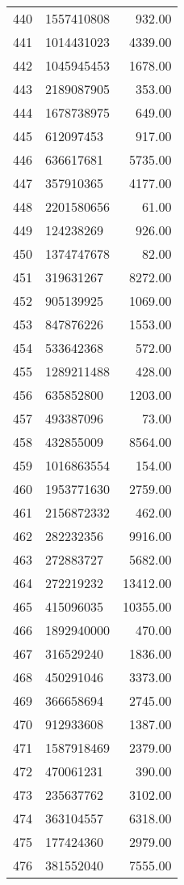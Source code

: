 \begin{table}[ht]
\begin{tabular}{rlr}
  440 & 1557410808 & 932.00 \\ 
  441 & 1014431023 & 4339.00 \\ 
  442 & 1045945453 & 1678.00 \\ 
  443 & 2189087905 & 353.00 \\ 
  444 & 1678738975 & 649.00 \\ 
  445 & 612097453 & 917.00 \\ 
  446 & 636617681 & 5735.00 \\ 
  447 & 357910365 & 4177.00 \\ 
  448 & 2201580656 & 61.00 \\ 
  449 & 124238269 & 926.00 \\ 
  450 & 1374747678 & 82.00 \\ 
  451 & 319631267 & 8272.00 \\ 
  452 & 905139925 & 1069.00 \\ 
  453 & 847876226 & 1553.00 \\ 
  454 & 533642368 & 572.00 \\ 
  455 & 1289211488 & 428.00 \\ 
  456 & 635852800 & 1203.00 \\ 
  457 & 493387096 & 73.00 \\ 
  458 & 432855009 & 8564.00 \\ 
  459 & 1016863554 & 154.00 \\ 
  460 & 1953771630 & 2759.00 \\ 
  461 & 2156872332 & 462.00 \\ 
  462 & 282232356 & 9916.00 \\ 
  463 & 272883727 & 5682.00 \\ 
  464 & 272219232 & 13412.00 \\ 
  465 & 415096035 & 10355.00 \\ 
  466 & 1892940000 & 470.00 \\ 
  467 & 316529240 & 1836.00 \\ 
  468 & 450291046 & 3373.00 \\ 
  469 & 366658694 & 2745.00 \\ 
  470 & 912933608 & 1387.00 \\ 
  471 & 1587918469 & 2379.00 \\ 
  472 & 470061231 & 390.00 \\ 
  473 & 235637762 & 3102.00 \\ 
  474 & 363104557 & 6318.00 \\ 
  475 & 177424360 & 2979.00 \\ 
  476 & 381552040 & 7555.00 \\ 

\end{tabular}
\end{table}
